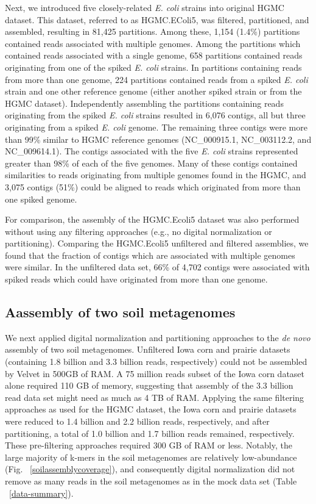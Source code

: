 \documentclass{pnastwo}
\begin{document}
\begin{article}
Next, we introduced five closely-related \emph{E. coli} strains into original
HGMC dataset. This dataset, referred to as HGMC.EColi5, was filtered,
partitioned, and assembled, resulting in 81,425 partitions. Among these, 1,154
(1.4\%) partitions contained reads associated with multiple genomes. Among the
partitions which contained reads associated with a single genome, 658 partitions
contained reads originating from one of the spiked \emph{E. coli} strains. In
partitions containing reads from more than one genome, 224 partitions contained
reads from a spiked \emph{E. coli} strain and one other reference genome (either
another spiked strain or from the HGMC dataset). Independently assembling the
partitions containing reads originating from the spiked \emph{E. coli} strains
resulted in 6,076 contigs, all but three originating from a spiked \emph{E.
coli} genome. The remaining three contigs were more than 99\% similar to HGMC
reference genomes (NC\_000915.1, NC\_003112.2, and NC\_009614.1). The contigs
associated with the five \emph{E. coli} strains represented greater than 98\% of
each of the five genomes. Many of these contigs contained similarities to reads
originating from multiple genomes found in the HGMC, and 3,075 contigs (51\%)
could be aligned to reads which originated from more than one spiked genome.

For comparison, the assembly of the HGMC.Ecoli5 dataset was also performed
without using any filtering approaches (e.g., no digital normalization or
partitioning). Comparing the HGMC.Ecoli5 unfiltered and filtered assemblies, we
found that the fraction of contigs which are associated with multiple genomes
were similar. In the unfiltered data set, 66\% of 4,702 contigs were associated
with spiked reads which could have originated from more than one genome.

\subsection*{Aassembly of two soil metagenomes} We next applied digital
normalization and partitioning approaches to the {\em de novo} assembly of two
soil metagenomes. Unfiltered Iowa corn and prairie datasets (containing 1.8
billion and 3.3 billion reads, respectively) could not be assembled by Velvet in
500GB of RAM. A 75 million reads subset of the Iowa corn dataset alone required
110 GB of memory, suggesting that assembly of the 3.3 billion read data set
might need as much as 4 TB of RAM. Applying the same filtering approaches as
used for the HGMC dataset, the Iowa corn and prairie datasets were reduced to
1.4 billion and 2.2 billion reads, respectively, and after partitioning, a total
of 1.0 billion and 1.7 billion reads remained, respectively. These pre-filtering
approaches required 300 GB of RAM or less. Notably, the large majority of k-mers
in the soil metagenomes are relatively low-abundance (Fig.
~\ref{soilassemblycoverage}), and consequently digital normalization did not
remove as many reads in the soil metagenomes as in the mock data set (Table
~\ref{data-summary}).


\end{article}
\end{document}
